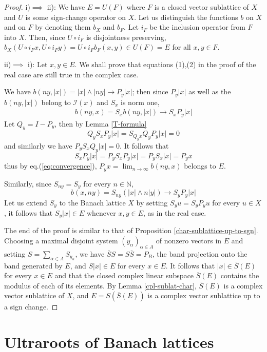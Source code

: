 \documentclass[11pt]{amsart}
\theoremstyle{plain}
\theoremstyle{remark}
\newcommand{\I}{\mathcal I}
\newcommand{\To}{\mathop{\longrightarrow}}
\begin{document}
\begin{proof}
i)$\implies$ ii): We have $E=U(F)$ where $F$ is a closed vector sublattice of $X$ and $U$ is some sign-change operator on $X$. Let us distinguish the functions $b$ on $X$ and on $F$ by denoting them $b_X$ and $b_F$. Let $i_F$ be the inclusion operator from $F$ into $X$. Then, since $U\circ i_F$ is disjointness preserving, $ b_X(U\circ i_F x,U\circ i_F y)=U\circ i_F  b_F(x,y)\in U(F)=E$ for all $x,y\in F$.

ii)$\implies$ i): Let $x,y\in E$. We shall prove that equations (1),(2) in the proof of the real case are still true in the complex case.

We have $b(ny,|x|)=|x|\wedge |ny|\to P_y|x|$; then since $P_y|x|$ as well as the $b(ny,|x|)$ belong to $\I(x)$ and $S_x$ is norm  one,  
\begin{align}\label{eq:convergence}
b(ny,x)= S_x b(ny,|x|)\to S_xP_y|x|
\end{align}
Let $Q_y=I-P_y$, then by Lemma \ref{T-formula}
\[Q_yS_xP_y|x|=S_{Q_yx}Q_yP_y|x|=0\]
and similarly we have $P_yS_xQ_y|x|=0$.
It follows that
\[S_xP_y|x|=P_yS_xP_y|x|=P_yS_x|x|=P_yx\]
thus by eq.(\ref{eq:convergence}), $P_yx=\lim_{n\to \infty} b(ny,x)$ belongs to $E$. 

Similarly, since $S_{ny}=S_y$ for every $n\in \mathbb N$, 
\[b(x,ny)=S_{ny}(|x|\wedge n|y|)\To S_yP_y|x| \]
Let us extend $S_y$ to the Banach lattice $X$ by setting $S_yu=S_yP_yu$ for every $u\in X$, it follows that $S_y|x|\in E$ whenever $x,y\in E$, as in the real case.

The end of the proof is similar to that of Proposition \ref{char-sublattice-up-to-sgn}. Choosing a maximal disjoint system $(y_\alpha)_{\alpha\in A}$ of nonzero vectors in $E$ and setting $S=\sum_{\alpha\in A} S_{y_\alpha}$, we have $\overline S S= S \overline S=P_B$, the band projection onto the band generated by $E$, and $S|x|\in E$ for every $x\in E$. It follows that $|x|\in \overline S (E)$ for every $x\in E$ and that the closed complex linear subspace $\overline S (E)$ contains the modulus of each of its elements. By Lemma \ref{cpl-sublat-char}, $\overline S (E)$ is a complex vector sublattice of $X$, and $E=S (\overline S (E))$ is a complex vector sublattice up to a sign change.
 \end{proof}


\section{Ultraroots of Banach lattices}\label{section:UBL}
\end{document}
